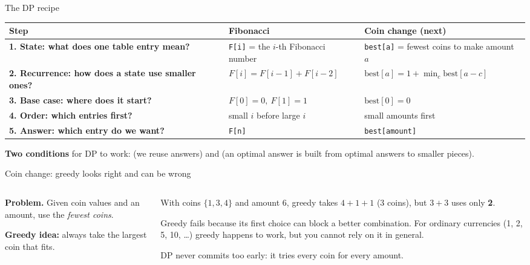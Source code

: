 \documentclass[aspectratio=169,10pt]{beamer}
\begin{document}
\begin{frame}{The DP recipe}
\renewcommand{\arraystretch}{1.35}\small
\begin{tabular}{@{}>{\raggedright\bfseries}p{42mm}>{\raggedright}p{50mm}>{\raggedright\arraybackslash}p{50mm}@{}}
\toprule
Step & Fibonacci & Coin change (next)\\\midrule
1. \textbf{State}: what does one table entry mean? & \texttt{F[i]} = the $i$-th Fibonacci number & \texttt{best[a]} = fewest coins to make amount $a$\\
2. \textbf{Recurrence}: how does a state use smaller ones? & $F[i]=F[i-1]+F[i-2]$ & $\mathrm{best}[a]=1+\min_c \mathrm{best}[a-c]$\\
3. \textbf{Base case}: where does it start? & $F[0]=0,\ F[1]=1$ & $\mathrm{best}[0]=0$\\
4. \textbf{Order}: which entries first? & small $i$ before large $i$ & small amounts first\\
5. \textbf{Answer}: which entry do we want? & \texttt{F[n]} & \texttt{best[amount]}\\
\bottomrule
\end{tabular}
\vspace{4mm}

{\small \textbf{Two conditions} for DP to work:  (we reuse answers) and  (an optimal answer is built from optimal answers to smaller pieces).}
\end{frame}

\begin{frame}{Coin change: greedy looks right and can be wrong}
\begin{columns}[T]
\begin{column}{0.5\textwidth}
{\small
\textbf{Problem.} Given coin values and an amount, use the \emph{fewest coins}.

\vspace{2mm}
\textbf{Greedy idea:} always take the largest coin that fits.
}
\vspace{1mm}
\end{column}
\begin{column}{0.46\textwidth}
\vspace{2mm}
{\small
With coins $\{1,3,4\}$ and amount $6$, greedy takes $4+1+1$ (3 coins), but $3+3$ uses only \textbf{2}.

\vspace{2mm}
Greedy fails because its first choice can block a better combination. For ordinary currencies (1, 2, 5, 10, \ldots) greedy happens to work, but you cannot rely on it in general.

\vspace{2mm}
DP never commits too early: it tries every coin for every amount.}
\end{column}
\end{columns}
\end{frame}
\end{document}
